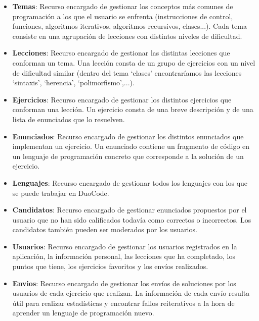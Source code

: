 \begin{itemize}

\item \textbf{Temas}: 
Recurso encargado de gestionar los conceptos más comunes de programación a los que el usuario se enfrenta (instrucciones de control, funciones, algoritmos iterativos, algoritmos recursivos, clases...). Cada tema consiste en una agrupación de lecciones con distintos niveles de dificultad.

\item \textbf{Lecciones}:
Recurso encargado de gestionar las distintas lecciones que conforman un tema. Una lección consta de un grupo de ejercicios con un nivel de dificultad similar (dentro del tema `clases' encontraríamos las lecciones `sintaxis', `herencia', `polimorfismo',...).

\item \textbf{Ejercicios}:
Recurso encargado de gestionar los distintos ejercicios que conforman una lección. Un ejercicio consta de una breve descripción y de una lista de enunciados que lo resuelven.

\item \textbf{Enunciados}:
Recurso encargado de gestionar los distintos enunciados que implementan un ejercicio. Un enunciado contiene un fragmento de código en un lenguaje de programación concreto que corresponde a la solución de un ejercicio.

\item \textbf{Lenguajes}:
Recurso encargado de gestionar todos los lenguajes con los que se puede trabajar en DuoCode.

\item \textbf{Candidatos}:
Recurso encargado de gestionar enunciados propuestos por el usuario que no han sido calificados todavía como correctos o incorrectos. Los candidatos también pueden ser moderados por los usuarios.

\item \textbf{Usuarios}:
Recurso encargado de gestionar los usuarios registrados en la aplicación, la información personal, las lecciones que ha completado, los puntos que tiene, los ejercicios favoritos y los envíos realizados.

\item \textbf{Envios}:
Recurso encargado de gestionar los envíos de soluciones por los usuarios de cada ejercicio que realizan. La información de cada envío resulta útil para realizar estadísticas y encontrar fallos reiterativos a la hora de aprender un lenguaje de programación nuevo.

\end{itemize}

